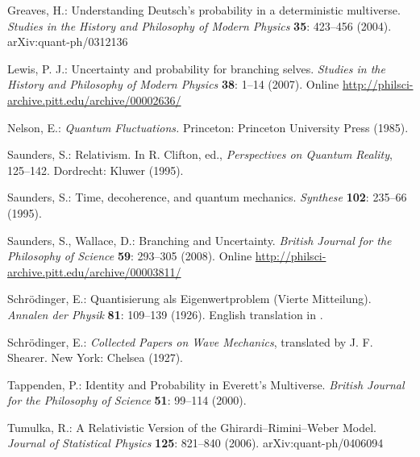\documentclass[12pt]{article}
\begin{document}
\begin{thebibliography}{29}
 Greaves, H.: 
	Understanding Deutsch's probability in a deterministic multiverse. 
	\textit{Studies in the History and Philosophy of Modern Physics} 
	\textbf{35}: 423--456 (2004). arXiv:quant-ph/0312136

  Lewis, P. J.: 
	Uncertainty and probability for branching selves. 
	\textit{Studies in the History and Philosophy of Modern Physics} 
	\textbf{38}: 1--14 (2007).
	Online \url{http://philsci-archive.pitt.edu/archive/00002636/}

 Nelson, E.: \textit{Quantum Fluctuations.}
  Princeton: Princeton University Press (1985).
   

 Saunders, S.:  
	Relativism. 
	In R. Clifton, ed., {\em Perspectives on Quantum Reality}, 125--142.
	Dordrecht: Kluwer (1995).

 Saunders, S.:  Time, decoherence, and quantum mechanics. \textit{Synthese} \textbf{102}: 235--66 (1995).



 Saunders, S.,  Wallace, D.: 
	Branching and Uncertainty. 
	\textit{British Journal for the Philosophy of Science}
	\textbf{59}: 293--305 (2008).
	Online \url{http://philsci-archive.pitt.edu/archive/00003811/}
	
Schr\"odinger, E.: 
	Quantisierung als Eigenwertproblem (Vierte Mitteilung).
	\textit{Annalen der Physik} \textbf{81}: 109--139  (1926).  
	English translation in \cite{sch}.

 Schr\"odinger, E.: 
	\textit{Collected Papers on Wave Mechanics}, translated by J. F. Shearer. 
	New York: Chelsea (1927).

 Tappenden, P.: 
	Identity and Probability in Everett's Multiverse. 
	\textit{British Journal for the Philosophy of Science} \textbf{51}: 99--114 (2000).

 Tumulka, R.: 
	A Relativistic Version of the Ghirardi--Rimini--Weber Model.
	\textit{Journal of Statistical Physics} \textbf{125}: 821--840 (2006). 
	arXiv:quant-ph/0406094



\end{thebibliography}
\end{document}
